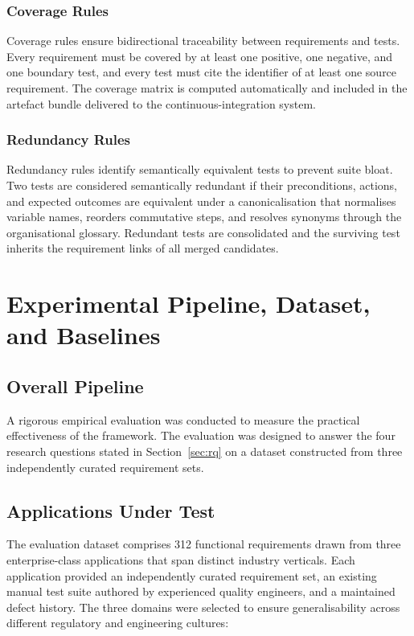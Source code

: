\documentclass[11pt,letterpaper]{article}
\begin{document}
\subsubsection{Coverage Rules}
Coverage rules ensure bidirectional traceability between requirements and tests. Every requirement must be covered by at least one positive, one negative, and one boundary test, and every test must cite the identifier of at least one source requirement. The coverage matrix is computed automatically and included in the artefact bundle delivered to the continuous-integration system.

\subsubsection{Redundancy Rules}
Redundancy rules identify semantically equivalent tests to prevent suite bloat. Two tests are considered semantically redundant if their preconditions, actions, and expected outcomes are equivalent under a canonicalisation that normalises variable names, reorders commutative steps, and resolves synonyms through the organisational glossary. Redundant tests are consolidated and the surviving test inherits the requirement links of all merged candidates.

\section{Experimental Pipeline, Dataset, and Baselines}
\label{sec:dataset}

\subsection{Overall Pipeline}

A rigorous empirical evaluation was conducted to measure the practical effectiveness of the framework. The evaluation was designed to answer the four research questions stated in Section~\ref{sec:rq} on a dataset constructed from three independently curated requirement sets.

\subsection{Applications Under Test}

The evaluation dataset comprises 312 functional requirements drawn from three enterprise-class applications that span distinct industry verticals. Each application provided an independently curated requirement set, an existing manual test suite authored by experienced quality engineers, and a maintained defect history. The three domains were selected to ensure generalisability across different regulatory and engineering cultures:
\end{document}
